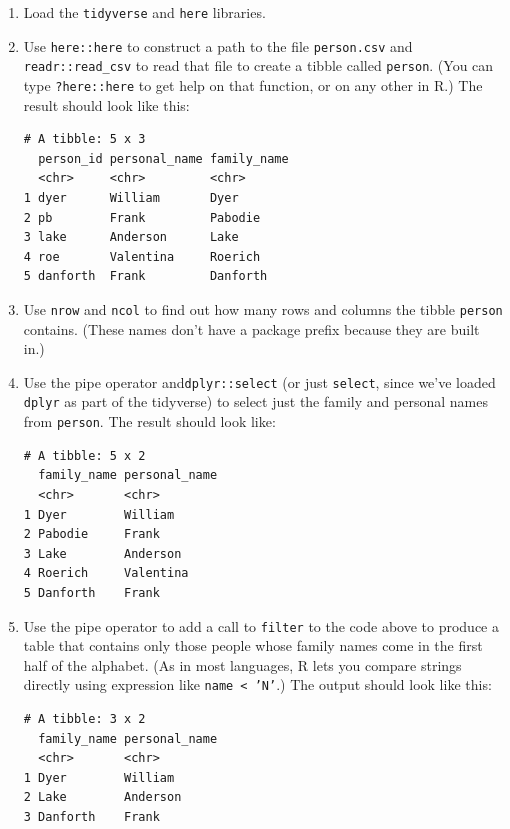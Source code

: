 \begin{enumerate}

\item
  Load the \texttt{tidyverse} and \texttt{here} libraries.

\item
  Use \texttt{here::here} to construct a path to the file \texttt{person.csv}
  and \texttt{readr::read\_csv} to read that file to create a tibble called \texttt{person}.
  (You can type \texttt{?here::here} to get help on that function,
  or on any other in R.)
  The result should look like this:

\begin{lstlisting}
# A tibble: 5 x 3
  person_id personal_name family_name
  <chr>     <chr>         <chr>      
1 dyer      William       Dyer       
2 pb        Frank         Pabodie    
3 lake      Anderson      Lake       
4 roe       Valentina     Roerich    
5 danforth  Frank         Danforth   
\end{lstlisting}

\item
  Use \texttt{nrow} and \texttt{ncol} to find out
  how many rows and columns the tibble \texttt{person} contains.
  (These names don't have a package prefix because they are built in.)

\item
  Use the pipe operator \texttt{\pipe} and\texttt{dplyr::select}
  (or just \texttt{select}, since we've loaded \texttt{dplyr} as part of the tidyverse)
  to select just the family and personal names from \texttt{person}.
  The result should look like:

\begin{lstlisting}
# A tibble: 5 x 2
  family_name personal_name
  <chr>       <chr>        
1 Dyer        William      
2 Pabodie     Frank        
3 Lake        Anderson     
4 Roerich     Valentina    
5 Danforth    Frank        
\end{lstlisting}

\item
  Use the pipe operator \texttt{\pipe} to add a call to \texttt{filter}
  to the code above
  to produce a table that contains only those people whose family names come in the first half of the alphabet.
  (As in most languages, R lets you compare strings directly using expression like \texttt{name {\textless} 'N'}.)
  The output should look like this:

\begin{lstlisting}
# A tibble: 3 x 2
  family_name personal_name
  <chr>       <chr>        
1 Dyer        William      
2 Lake        Anderson     
3 Danforth    Frank        
\end{lstlisting}


\end{enumerate}
